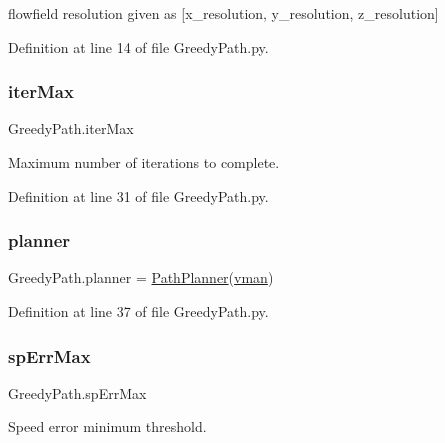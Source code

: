 flowfield resolution given as \mbox{[}x\+\_\+resolution, y\+\_\+resolution, z\+\_\+resolution\mbox{]} 



Definition at line 14 of file Greedy\+Path.\+py.

\mbox{\label{namespace_greedy_path_a5b46b8310be6f398493f6f89ea93c90f}} 
\subsubsection{\texorpdfstring{iter\+Max}{iterMax}}
{\footnotesize\ttfamily Greedy\+Path.\+iter\+Max}



Maximum number of iterations to complete. 



Definition at line 31 of file Greedy\+Path.\+py.

\mbox{\label{namespace_greedy_path_a48d2bf39a0cc9f5e87640f060e67bd1c}} 
\subsubsection{\texorpdfstring{planner}{planner}}
{\footnotesize\ttfamily Greedy\+Path.\+planner = \mbox{\hyperlink{classpath_plan_1_1_path_planner}{Path\+Planner}}(\mbox{\hyperlink{namespace_greedy_path_a0b686e13d9e46e185e611dc0b5d92e8f}{vman}})}



Definition at line 37 of file Greedy\+Path.\+py.

\mbox{\label{namespace_greedy_path_ac15dd3310629c8a8e6be44d3a182f356}} 
\subsubsection{\texorpdfstring{sp\+Err\+Max}{spErrMax}}
{\footnotesize\ttfamily Greedy\+Path.\+sp\+Err\+Max}



Speed error minimum threshold. 



